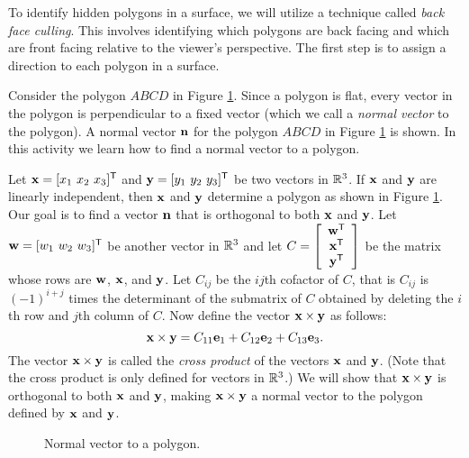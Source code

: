 	\ea
\ee


To identify hidden polygons in a surface, we will utilize a technique called \emph{back face culling}. This involves identifying which polygons are back facing and which are front facing relative to the viewer's perspective. The first step is to assign a direction to each polygon in a surface. 

\begin{pactivity} \label{act:bf_normal} Consider the polygon $ABCD$ in Figure \ref{F:Normal_vector}. Since a polygon is flat, every vector in the polygon is perpendicular to a fixed vector (which we call a \emph{normal vector} to the polygon). A normal vector $\mathbf{n}$ for the polygon $ABCD$ in Figure \ref{F:Normal_vector} is shown. In this activity we learn how to find a normal vector to a polygon.

Let  $\mathbf{x} = [x_1 \ x_2 \ x_3]^{\mathsf{T}}$ and $\mathbf{y} = [y_1 \ y_2 \ y_3]^{\mathsf{T}}$ be two vectors in $\mathbb{R}^3$. If $\mathbf{x}$ and $\mathbf{y}$ are linearly independent, then $\mathbf{x}$ and $\mathbf{y}$ determine a polygon as shown in Figure \ref{F:Normal_vector}. Our goal is to find a vector $\mathbf{n}$ that is orthogonal to both $\mathbf{x}$ and $\mathbf{y}$. Let $\mathbf{w} = [w_1 \ w_2 \ w_3]^{\mathsf{T}}$ be another vector in $\mathbb{R}^3$ and let $C = \left[ \begin{array}{c} \mathbf{w}^{\mathsf{T}} \\ \mathbf{x}^{\mathsf{T}} \\ \mathbf{y}^{\mathsf{T}} \end{array} \right]$ be the matrix whose rows are $\mathbf{w}$, $\mathbf{x}$, and $\mathbf{y}$. Let $C_{ij}$ be the $ij$th cofactor of $C$, that is $C_{ij}$ is $(-1)^{i+j}$ times the determinant of the submatrix of $C$ obtained by deleting the $i$th row and $j$th column of $C$.  Now define the vector $\mathbf{x} \times \mathbf{y}$ as follows:
\[\mathbf{x} \times \mathbf{y} = C_{11}\mathbf{e}_1 + C_{12}\mathbf{e}_2 + C_{13} \mathbf{e}_3.\]
The vector $\mathbf{x} \times \mathbf{y}$ is called the \emph{cross product} of the vectors $\mathbf{x}$ and $\mathbf{y}$. (Note that the cross product is only defined for vectors in $\mathbb{R}^3$.) We will show that $\mathbf{x} \times \mathbf{y}$ is orthogonal to both $\mathbf{x}$ and $\mathbf{y}$, making $\mathbf{x} \times \mathbf{y}$ a normal vector to the polygon defined by $\mathbf{x}$ and $\mathbf{y}$.  
\begin{center}
\begin{figure}[ht] 
\begin{center}
\caption{Normal vector to a polygon.}
\label{F:Normal_vector}
\end{center}
\end{figure}
\end{center}


\end{pactivity}
